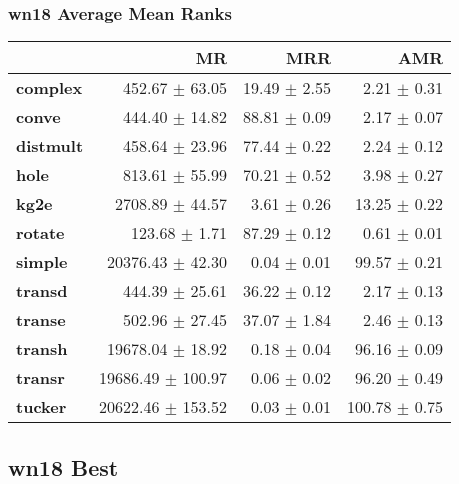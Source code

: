 \documentclass{article}
\begin{document}
\subsubsection{wn18 Average Mean Ranks}
    \begin{center}
    \begin{tabular}{lrrr}
\toprule
{} &                 MR &           MRR &            AMR \\
\midrule
\textbf{complex } &     452.67 $\pm$ 63.05 &  19.49 $\pm$ 2.55 &    2.21 $\pm$ 0.31 \\
\textbf{conve   } &     444.40 $\pm$ 14.82 &  88.81 $\pm$ 0.09 &    2.17 $\pm$ 0.07 \\
\textbf{distmult} &     458.64 $\pm$ 23.96 &  77.44 $\pm$ 0.22 &    2.24 $\pm$ 0.12 \\
\textbf{hole    } &     813.61 $\pm$ 55.99 &  70.21 $\pm$ 0.52 &    3.98 $\pm$ 0.27 \\
\textbf{kg2e    } &    2708.89 $\pm$ 44.57 &   3.61 $\pm$ 0.26 &   13.25 $\pm$ 0.22 \\
\textbf{rotate  } &      123.68 $\pm$ 1.71 &  87.29 $\pm$ 0.12 &    0.61 $\pm$ 0.01 \\
\textbf{simple  } &   20376.43 $\pm$ 42.30 &   0.04 $\pm$ 0.01 &   99.57 $\pm$ 0.21 \\
\textbf{transd  } &     444.39 $\pm$ 25.61 &  36.22 $\pm$ 0.12 &    2.17 $\pm$ 0.13 \\
\textbf{transe  } &     502.96 $\pm$ 27.45 &  37.07 $\pm$ 1.84 &    2.46 $\pm$ 0.13 \\
\textbf{transh  } &   19678.04 $\pm$ 18.92 &   0.18 $\pm$ 0.04 &   96.16 $\pm$ 0.09 \\
\textbf{transr  } &  19686.49 $\pm$ 100.97 &   0.06 $\pm$ 0.02 &   96.20 $\pm$ 0.49 \\
\textbf{tucker  } &  20622.46 $\pm$ 153.52 &   0.03 $\pm$ 0.01 &  100.78 $\pm$ 0.75 \\
\bottomrule
\end{tabular}

    \end{center}
\subsection{wn18 Best}
\end{document}
